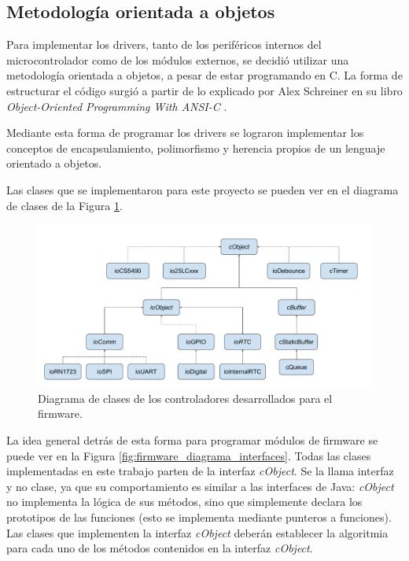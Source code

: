 \subsection{Metodología orientada a objetos}
\label{subsec:orientado_a_objetos}

Para implementar los drivers, tanto de los periféricos internos del microcontrolador como de los módulos externos, se decidió utilizar una metodología orientada a objetos, a pesar de estar programando en C. La forma de estructurar el código surgió a partir de lo explicado por Alex Schreiner en su libro \textit{Object-Oriented Programming With ANSI-C } \citep{schreiner1993}.

Mediante esta forma de programar los drivers se lograron implementar los conceptos de encapsulamiento, polimorfismo y herencia propios de un lenguaje orientado a objetos.

Las clases que se implementaron para este proyecto se pueden ver en el diagrama de clases de la Figura \ref{fig:firmware_diagrama_clases}.

\begin{figure}[h]
	\centering
	\includegraphics[width=14cm]{./Figures/3_2_3_diagrama-clases-simplificado.pdf}
	\caption{Diagrama de clases de los controladores desarrollados para el firmware.}
	\label{fig:firmware_diagrama_clases}
\end{figure}

La idea general detrás de esta forma para programar módulos de firmware se puede ver en la Figura \ref{fig:firmware_diagrama_interfaces}. Todas las clases implementadas en este trabajo parten de la interfaz \textit{cObject}. Se la llama interfaz y no clase, ya que su comportamiento es similar a las interfaces de Java: \textit{cObject} no implementa la lógica de sus métodos, sino que simplemente declara los prototipos de las funciones (esto se implementa mediante punteros a funciones). Las clases que implementen la interfaz \textit{cObject} deberán establecer la algoritmia para cada uno de los métodos contenidos en la interfaz \textit{cObject}.

